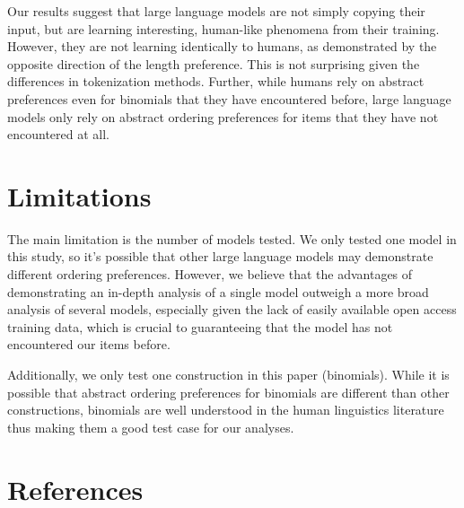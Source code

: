 \documentclass[
  10pt,
  nohyperref]{acl}
\begin{document}
Our results suggest that large language models are not simply copying
their input, but are learning interesting, human-like phenomena from
their training. However, they are not learning identically to humans, as
demonstrated by the opposite direction of the length preference. This is
not surprising given the differences in tokenization methods. Further,
while humans rely on abstract preferences even for binomials that they
have encountered before, large language models only rely on abstract
ordering preferences for items that they have not encountered at all.

\section{Limitations}\label{limitations}

The main limitation is the number of models tested. We only tested one
model in this study, so it's possible that other large language models
may demonstrate different ordering preferences. However, we believe that
the advantages of demonstrating an in-depth analysis of a single model
outweigh a more broad analysis of several models, especially given the
lack of easily available open access training data, which is crucial to
guaranteeing that the model has not encountered our items before.

Additionally, we only test one construction in this paper (binomials).
While it is possible that abstract ordering preferences for binomials
are different than other constructions, binomials are well understood in
the human linguistics literature thus making them a good test case for
our analyses.

\clearpage

\section*{References}\label{references}


\end{document}
